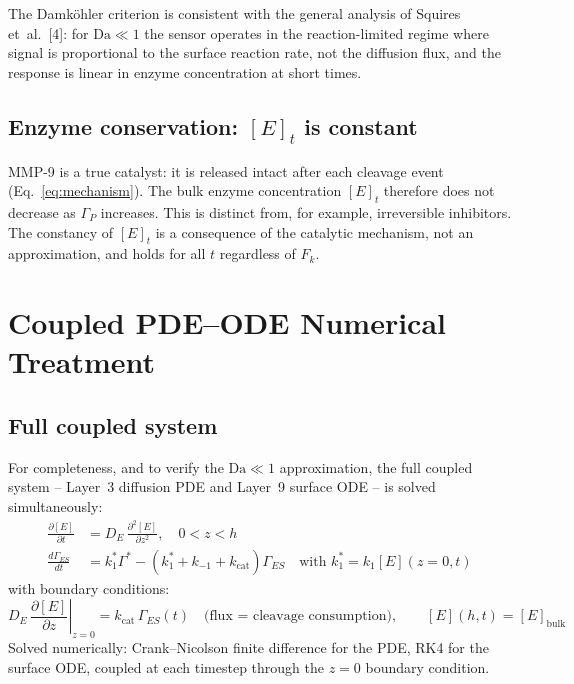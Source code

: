 \documentclass[10pt,a4paper]{article}
\numberwithin{equation}{section}
\newcommand{\cit}[1]{[#1]}
\newcommand{\kcat}{k_{\text{cat}}}
\newcommand{\GES}{\Gamma_{ES}}
\newcommand{\GP}{\Gamma_P}
\newcommand{\Gstar}{\Gamma^{*}}
\newcommand{\Da}{\mathrm{Da}}
\begin{document}
The Damk\"{o}hler criterion is consistent with the general analysis of Squires
et~al.~\cit{4}: for $\Da \ll 1$ the sensor operates in the reaction-limited regime
where signal is proportional to the surface reaction rate, not the diffusion flux,
and the response is linear in enzyme concentration at short times.

\subsection{Enzyme conservation: $[E]_t$ is constant}

MMP-9 is a true catalyst: it is released intact after each cleavage event
(Eq.~\eqref{eq:mechanism}). The bulk enzyme concentration $[E]_t$ therefore does
not decrease as $\GP$ increases. This is distinct from, for example, irreversible
inhibitors. The constancy of $[E]_t$ is a consequence of the catalytic mechanism,
not an approximation, and holds for all $t$ regardless of $F_k$.

\section{Coupled PDE--ODE Numerical Treatment}
\label{sec:coupled}

\subsection{Full coupled system}

For completeness, and to verify the $\Da \ll 1$ approximation, the full coupled
system -- Layer~3 diffusion PDE and Layer~9 surface ODE -- is solved simultaneously:
\begin{align}
  \frac{\partial [E]}{\partial t} &= D_E\,\frac{\partial^2[E]}{\partial z^2},
    \quad 0 < z < h \label{eq:pde} \\
  \frac{d\GES}{dt} &= k_1^*\Gstar - (k_1^* + k_{-1} + \kcat)\GES
    \quad \text{with } k_1^* = k_1[E](z{=}0,t) \label{eq:ode_coupled}
\end{align}
with boundary conditions:
\begin{equation}
  \left.D_E\,\frac{\partial[E]}{\partial z}\right|_{z=0} = \kcat\,\GES(t)
  \quad\text{(flux = cleavage consumption)}, \qquad
  [E](h,t) = [E]_{\text{bulk}}
  \label{eq:bc}
\end{equation}
Solved numerically: Crank--Nicolson finite difference for the PDE, RK4 for the surface
ODE, coupled at each timestep through the $z=0$ boundary condition.
\end{document}
